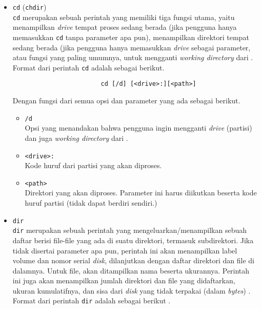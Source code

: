 \begin{itemize}
	\item \verb|cd| (\verb|chdir|) \cite{microsoftdocs:2021:windowscommands}\\
	\verb|cd| merupakan sebuah perintah yang memiliki tiga fungsi utama, yaitu menampilkan \textit{drive} tempat proses sedang berada (jika pengguna hanya memasukkan \verb|cd| tanpa parameter apa pun), menampilkan direktori tempat \cl\xspace sedang berada (jika pengguna hanya memasukkan \textit{drive} sebagai parameter, atau fungsi yang paling umumnya, untuk mengganti \textit{working directory} dari \cl.
	\newline\newline
	Format dari perintah \verb|cd| adalah sebagai berikut.
	
	\begin{verbatim}
                        cd [/d] [<drive>:][<path>]
	\end{verbatim}
	
	Dengan fungsi dari semua opsi dan parameter yang ada sebagai berikut.
	
	\begin{itemize}
		\item \verb|/d|\\
		Opsi yang menandakan bahwa pengguna ingin mengganti \textit{drive} (partisi) dan juga \textit{working directory} dari \cl.
		\item \verb|<drive>:|\\
		Kode huruf dari partisi yang akan diproses.
		\item \verb|<path>|\\
		Direktori yang akan diproses. Parameter ini harus diikutkan beserta kode huruf partisi (tidak dapat berdiri sendiri.)
	\end{itemize}
	
	\item \verb|dir|\\
	\verb|dir| merupakan sebuah perintah yang mengeluarkan/menampilkan sebuah daftar berisi file-file yang ada di suatu direktori, termasuk subdirektori. Jika tidak disertai parameter apa pun, perintah ini akan menampilkan label volume dan nomor serial \textit{disk}, dilanjutkan dengan daftar direktori dan file di dalamnya. Untuk file, akan ditampilkan nama beserta ukurannya. Perintah ini juga akan menampilkan jumlah direktori dan file yang didaftarkan, ukuran kumulatifnya, dan sisa dari \textit{disk} yang tidak terpakai (dalam \textit{bytes}) \cite{microsoftdocs:2021:windowscommands}.
	\newline\newline
	Format dari perintah \verb|dir| adalah sebagai berikut \cite{mueller:2007:windowscommandline}.
	

\end{itemize}
